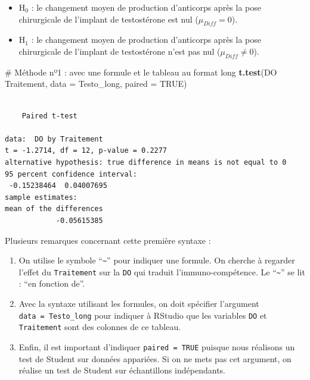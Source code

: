\documentclass[
  a4paper,
]{article}
\newenvironment{Shaded}{\begin{snugshade}}{\end{snugshade}}
\newcommand{\CommentTok}[1]{\textcolor[rgb]{0.54,0.53,0.53}{#1}}
\newcommand{\DataTypeTok}[1]{\textcolor[rgb]{0.00,0.34,0.68}{#1}}
\newcommand{\KeywordTok}[1]{\textcolor[rgb]{0.12,0.11,0.11}{\textbf{#1}}}
\newcommand{\NormalTok}[1]{\textcolor[rgb]{0.12,0.11,0.11}{#1}}
\newcommand{\OperatorTok}[1]{\textcolor[rgb]{0.12,0.11,0.11}{#1}}
\newcommand{\OtherTok}[1]{\textcolor[rgb]{0.00,0.43,0.16}{#1}}
\newcommand{\StringTok}[1]{\textcolor[rgb]{0.75,0.01,0.01}{#1}}
\providecommand{\tightlist}{%
  \setlength{\itemsep}{0pt}\setlength{\parskip}{0pt}}
\begin{document}
\begin{itemize}
\tightlist
\item
  H\(_0\) : le changement moyen de production d'anticorps après la pose chirurgicale de l'implant de testostérone est nul (\(\mu_{Diff} = 0\)).
\item
  H\(_1\) : le changement moyen de production d'anticorps après la pose chirurgicale de l'implant de testostérone n'est pas nul (\(\mu_{Diff} \neq 0\)).
\end{itemize}

\begin{Shaded}
\begin{Highlighting}[]
\CommentTok{# Méthode nº1 : avec une formule et le tableau au format long}
\KeywordTok{t.test}\NormalTok{(DO }\OperatorTok{~}\StringTok{ }\NormalTok{Traitement, }\DataTypeTok{data =}\NormalTok{ Testo_long, }\DataTypeTok{paired =} \OtherTok{TRUE}\NormalTok{)}
\end{Highlighting}
\end{Shaded}

\begin{verbatim}

    Paired t-test

data:  DO by Traitement
t = -1.2714, df = 12, p-value = 0.2277
alternative hypothesis: true difference in means is not equal to 0
95 percent confidence interval:
 -0.15238464  0.04007695
sample estimates:
mean of the differences 
            -0.05615385 
\end{verbatim}

Plusieurs remarques concernant cette première syntaxe :

\begin{enumerate}
\def\labelenumi{\arabic{enumi}.}
\tightlist
\item
  On utilise le symbole ``\texttt{\textasciitilde{}}'' pour indiquer une formule. On cherche à regarder l'effet du \texttt{Traitement} sur la \texttt{DO} qui traduit l'immuno-compétence. Le ``\texttt{\textasciitilde{}}'' se lit : ``en fonction de''.
\item
  Avec la syntaxe utilisant les formules, on doit spécifier l'argument \texttt{data\ =\ Testo\_long} pour indiquer à RStudio que les variables \texttt{DO} et \texttt{Traitement} sont des colonnes de ce tableau.
\item
  Enfin, il est important d'indiquer \texttt{paired\ =\ TRUE} puisque nous réalisons un test de Student sur données appariées. Si on ne mets pas cet argument, on réalise un test de Student sur échantillons indépendants.
\end{enumerate}
\end{document}
